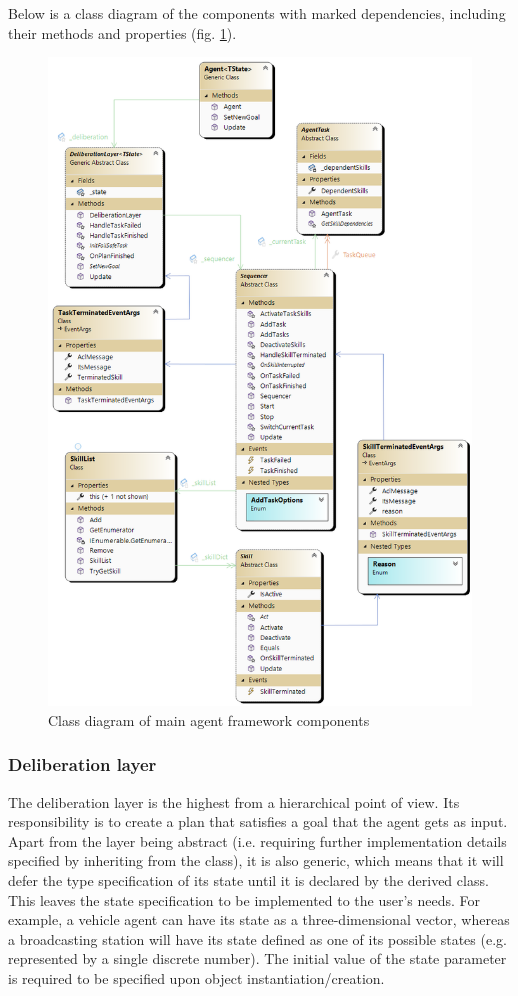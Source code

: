 \documentclass[0main.tex]{subfiles}
\begin{document}
Below is a class diagram of the components with marked dependencies, including their methods and 
properties (fig. \ref{mas-its-components}).


\begin{figure}[htbp]
    \centering
    \includegraphics[width=.9\textwidth]{MAS-ITS-Components.png}
    \caption{Class diagram of main agent framework components}
    \label{mas-its-components}
\end{figure}

\subsubsection{Deliberation layer}

The deliberation layer is the highest from a hierarchical point of view. Its responsibility is to 
create a plan that satisfies a goal that the agent gets as input. Apart from the layer 
being abstract (i.e. requiring further implementation details specified by inheriting from the 
class), it is also generic, which means that it will defer the type specification of its state until 
it is declared by the derived class. This leaves the state specification to be implemented 
to the user's needs. For example, a vehicle agent can have its state as a three-dimensional
vector, whereas a broadcasting station will have its state defined as one of its possible
states (e.g. represented by a single discrete number).  The initial value of the state parameter
is required to be specified upon object instantiation/creation.
\end{document}
